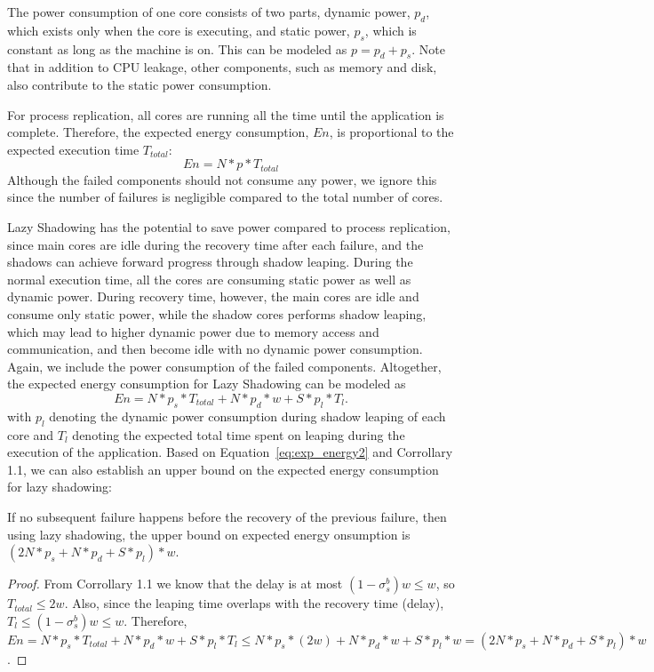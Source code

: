 The power consumption of one core consists of two parts, dynamic power, $p_d$, which exists only when the core is executing, and static power, $p_s$, which is constant as long as the machine is on. This can be modeled as $p = p_d + p_s$. Note that in addition to CPU leakage, other components, such as memory and disk, also contribute to the static power consumption. 

For process replication, all cores are running all the time until the application is complete. Therefore, the expected energy consumption, $En$, is proportional to the expected execution time $T_{total}$: 
\begin{equation}
En = N * p * T_{total}
\label{eq:exp_energy1}
\end{equation} 
Although the failed components should not consume any power, we ignore this since the number of failures is negligible compared to the total number of cores.

Lazy Shadowing has the potential to save power compared to process replication, since main cores are idle during the recovery time after each failure, and the shadows can achieve forward progress through shadow leaping. During the normal execution time, all the cores are consuming static power as well as dynamic power. During recovery time, however, the main cores are idle and consume only static power, while the shadow cores performs shadow leaping, which may lead to higher dynamic power due to memory access and communication, and then become idle with no dynamic power consumption. Again, we include the power consumption of the failed components. Altogether, the expected energy consumption for Lazy Shadowing can be modeled as 
\begin{equation}
En = N * p_s * T_{total} + N * p_d * w + S * p_{l} * T_l.
\label{eq:exp_energy2}
\end{equation}
with $p_{l}$ denoting the dynamic power consumption during shadow leaping of each core and $T_l$ denoting the expected total time spent on leaping during the execution of the application. Based on Equation~\ref{eq:exp_energy2} and Corrollary 1.1, we can also establish an upper bound on the expected energy consumption for lazy shadowing:

\begin{theorem}
If no subsequent failure happens before the recovery of the previous failure, then using lazy shadowing, the upper bound on expected energy onsumption is
$(2N * p_s + N * p_d + S * p_{l})*w$.
\end{theorem}
\begin{proof}
From Corrollary 1.1 we know that the delay is at most $(1-\sigma_s^b)w \le w$, so $T_{total} \le 2w$. Also, since the leaping time overlaps with the recovery time (delay), $T_l \le (1-\sigma_s^b)w \le w$. Therefore, $En = N * p_s * T_{total} + N * p_d * w + S * p_{l} * T_l \le N * p_s * (2w) + N * p_d * w + S * p_{l} * w = (2N * p_s + N * p_d + S * p_{l})*w$.
\end{proof}
